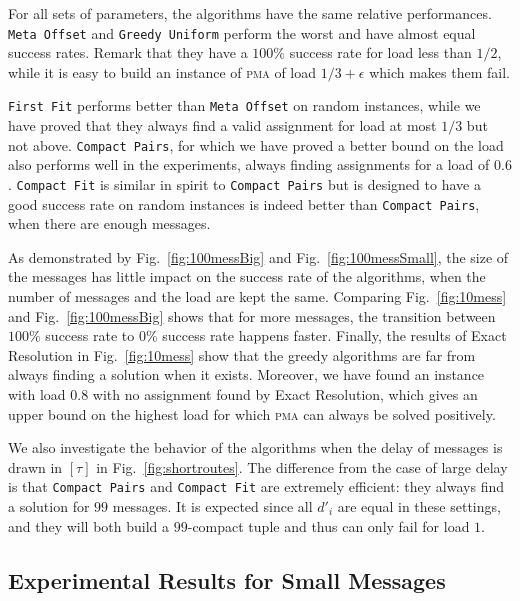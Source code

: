 \documentclass[a4paper,UKenglish,cleveref, autoref, thm-restate]{lipics-v2019}
\newcommand\pma{\textsc{pma}\xspace}
\newcommand\firstfit{\texttt{First Fit}\xspace}
\newcommand\compactpair{\texttt{Compact Pairs}\xspace}
\newcommand\metaoffset{\texttt{Meta Offset}\xspace}
\newcommand\greedyuniform{\texttt{Greedy Uniform}\xspace}
\newcommand\compactfit{\texttt{Compact Fit}\xspace}
\begin{document}
\medskip

For all sets of parameters, the algorithms have the same relative performances. \metaoffset and \greedyuniform perform the worst and have almost equal success rates. Remark that they have a $100\%$ success rate for load less than $1/2$, while it is easy to build an instance of \pma of load $1/3 +\epsilon$ which makes them fail. 

\firstfit performs better than \metaoffset on random instances, while we have proved that
they always find a valid assignment for load at most $1/3$ but not above.
 \compactpair, for which we have proved a better bound on the load also performs well in the experiments, always finding assignments for a load of $0.6$. \compactfit is similar in spirit to \compactpair but is designed to have a good success rate on random instances is indeed better than \compactpair, when there are enough messages.

As demonstrated by Fig.~\ref{fig:100messBig} and Fig.~\ref{fig:100messSmall}, the size of the messages has little impact on the success rate of the algorithms, when the number of messages and the load are kept the same. Comparing Fig.~\ref{fig:10mess} and Fig.~\ref{fig:100messBig} shows that for more messages, the transition between $100\%$ success rate to $0\%$ success rate happens faster.
Finally, the results of Exact Resolution in Fig.~\ref{fig:10mess} show that the greedy algorithms are far from always finding a solution when it exists. Moreover, we have found an instance with load $0.8$ with no assignment found by Exact Resolution, which gives an upper bound on the highest load for which \pma can always be solved positively.

We also investigate the behavior of the algorithms when the delay of messages is drawn in $[\tau]$ in Fig.~\ref{fig:shortroutes}. The difference from the case of large delay is that \compactpair and \compactfit are extremely efficient: they always find a solution for $99$ messages. It is expected since all $d'_i$ are equal in these settings, and they will both build a $99$-compact tuple and thus can only fail for load $1$.

\subsection{Experimental Results for Small Messages} \label{sec:perf_small}
\end{document}
